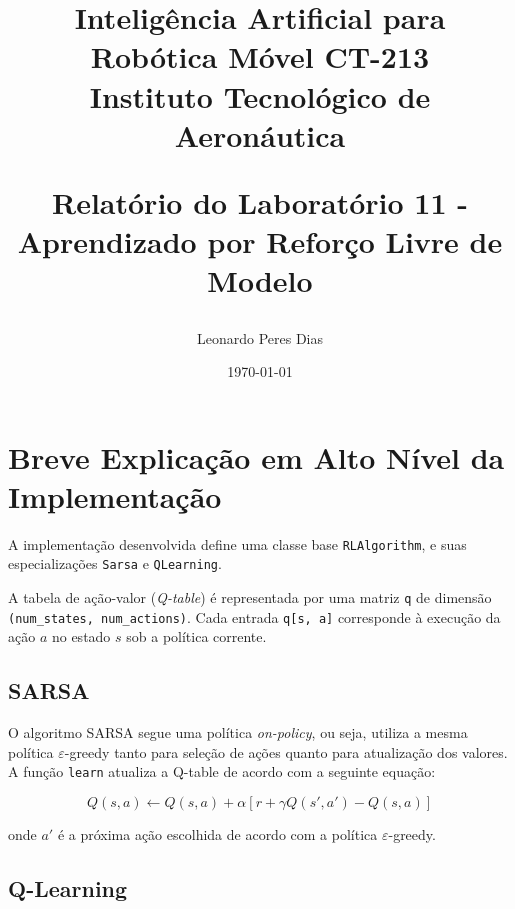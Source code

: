 \documentclass[a4paper,12pt]{article}
\title{
    \textbf{Inteligência Artificial para Robótica Móvel CT-213}\\
    \Large Instituto Tecnológico de Aeronáutica 

    \textbf{Relatório do Laboratório 11 -  Aprendizado por Reforço Livre de Modelo}\\
}
\author{
    Leonardo Peres Dias 
}
\date{\today}
\begin{document}
\BgThispage
\maketitle
\thispagestyle{empty} %


\newpage
\NoBgThispage %

\tableofcontents

\newpage
\NoBgThispage %

\section{Breve Explicação em Alto Nível da Implementação}
A implementação desenvolvida define uma classe base \texttt{RLAlgorithm}, e suas especializações \texttt{Sarsa} e \texttt{QLearning}.

A tabela de ação-valor (\textit{Q-table}) é representada por uma matriz \texttt{q} de dimensão \texttt{(num\_states, num\_actions)}. Cada entrada \texttt{q[s, a]} corresponde à execução da ação $a$ no estado $s$ sob a política corrente.

\subsection{SARSA}

O algoritmo SARSA segue uma política \textit{on-policy}, ou seja, utiliza a mesma política $\varepsilon$-greedy tanto para seleção de ações quanto para atualização dos valores. A função \texttt{learn} atualiza a Q-table de acordo com a seguinte equação:

\[
Q(s, a) \leftarrow Q(s, a) + \alpha \left[ r + \gamma Q(s', a') - Q(s, a) \right]
\]

onde $a'$ é a próxima ação escolhida de acordo com a política $\varepsilon$-greedy.

\subsection{Q-Learning}
\end{document}
